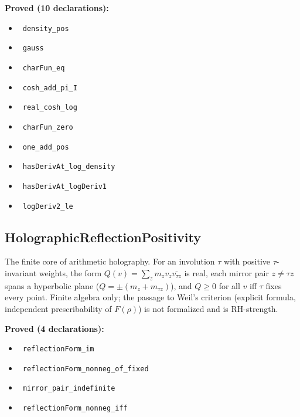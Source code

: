 \documentclass{report}
\theoremstyle{definition}
\begin{document}
\noindent\textbf{Proved (10 declarations):}
\begin{itemize}
  \item {}\leanok\ \texttt{density\_pos}
  \item {}\leanok\ \texttt{gauss}
  \item {}\leanok\ \texttt{charFun\_eq}
  \item {}\leanok\ \texttt{cosh\_add\_pi\_I}
  \item {}\leanok\ \texttt{real\_cosh\_log}
  \item {}\leanok\ \texttt{charFun\_zero}
  \item {}\leanok\ \texttt{one\_add\_pos}
  \item {}\leanok\ \texttt{hasDerivAt\_log\_density}
  \item {}\leanok\ \texttt{hasDerivAt\_logDeriv1}
  \item {}\leanok\ \texttt{logDeriv2\_le}
\end{itemize}

\subsection{HolographicReflectionPositivity}
The finite core of arithmetic holography. For an involution $\tau$ with positive $\tau$-invariant weights, the form $Q(v)=\sum_z m_z v_z\overline{v_{\tau z}}$ is real, each mirror pair $z\ne\tau z$ spans a hyperbolic plane ($Q=\pm(m_z+m_{\tau z})$), and $Q\ge0$ for all $v$ iff $\tau$ fixes every point. Finite algebra only; the passage to Weil's criterion (explicit formula, independent prescribability of $F(\rho)$) is not formalized and is RH-strength.

\noindent\textbf{Proved (4 declarations):}
\begin{itemize}
  \item {}\leanok\ \texttt{reflectionForm\_im}
  \item {}\leanok\ \texttt{reflectionForm\_nonneg\_of\_fixed}
  \item {}\leanok\ \texttt{mirror\_pair\_indefinite}
  \item {}\leanok\ \texttt{reflectionForm\_nonneg\_iff}
\end{itemize}
\end{document}
